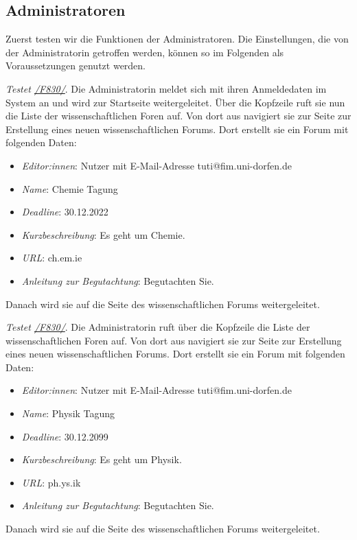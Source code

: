 \subsection{Administratoren}
Zuerst testen wir die Funktionen der Administratoren.
Die Einstellungen, die von der Administratorin getroffen werden, können so im Folgenden als Voraussetzungen genutzt werden.
\begin{description}

	 \emph{Testet \hyperref[funkt:830]{/F830/}}.
	Die Administratorin meldet sich mit ihren Anmeldedaten im System an und wird zur Startseite weitergeleitet.
	Über die Kopfzeile ruft sie nun die Liste der wissenschaftlichen Foren auf.
	Von dort aus navigiert sie zur Seite zur Erstellung eines neuen wissenschaftlichen Forums.
	Dort erstellt sie ein Forum mit folgenden Daten:
	\begin{itemize}
		\item \emph{Editor:innen}: Nutzer mit E-Mail-Adresse tuti@fim.uni-dorfen.de
		\item \emph{Name}: Chemie Tagung
		\item \emph{Deadline}: 30.12.2022
		\item \emph{Kurzbeschreibung}: Es geht um Chemie.
		\item \emph{URL}: ch.em.ie
		\item \emph{Anleitung zur Begutachtung}: Begutachten Sie.
	\end{itemize}
	Danach wird sie auf die Seite des wissenschaftlichen Forums weitergeleitet.

	 \emph{Testet \hyperref[funkt:830]{/F830/}}.
	Die Administratorin ruft über die Kopfzeile die Liste der wissenschaftlichen Foren auf.
	Von dort aus navigiert sie zur Seite zur Erstellung eines neuen wissenschaftlichen Forums.
	Dort erstellt sie ein Forum mit folgenden Daten:
	\begin{itemize}
		\item \emph{Editor:innen}: Nutzer mit E-Mail-Adresse tuti@fim.uni-dorfen.de
		\item \emph{Name}: Physik Tagung
		\item \emph{Deadline}: 30.12.2099
		\item \emph{Kurzbeschreibung}: Es geht um Physik.
		\item \emph{URL}: ph.ys.ik
		\item \emph{Anleitung zur Begutachtung}: Begutachten Sie.
	\end{itemize}
	Danach wird sie auf die Seite des wissenschaftlichen Forums weitergeleitet.

\end{description}

